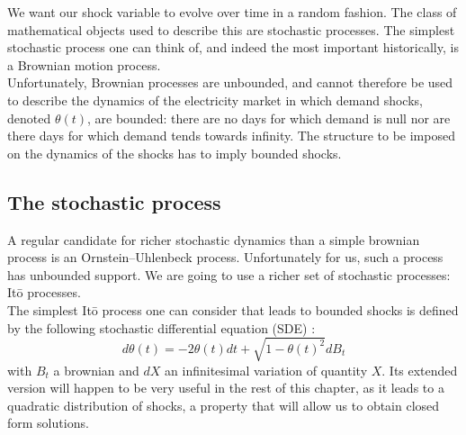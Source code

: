 We want our shock variable to evolve over time in a random fashion. The class of mathematical objects used to describe this are stochastic processes. The simplest stochastic process one can think of, and indeed the most important historically, is a Brownian motion process. \\

Unfortunately, Brownian processes are unbounded, and cannot therefore be used to describe the dynamics of the electricity market in which demand shocks, denoted $\theta(t)$, are bounded: there are no days for which demand is null nor are there days for which demand tends towards infinity. The structure to be imposed on the dynamics of the shocks has to imply bounded shocks.\\

%

\subsection{The stochastic process}
A regular candidate for richer stochastic dynamics than a simple brownian process is an Ornstein–Uhlenbeck process. Unfortunately for us, such a process has unbounded support. We are going to use a richer set of stochastic processes: It\={o} processes. \\

The simplest It\={o} process one can consider that leads to bounded shocks is defined by the following stochastic differential equation (SDE) \cite{enveloppe}:
\begin{equation}
d\theta(t)=-2\theta(t) dt+\sqrt{1-\theta(t)^2}dB_t
\label{eqSDE}
\end{equation}
with $B_t$ a brownian and $dX$ an infinitesimal variation of quantity $X$. Its extended version will happen to be very useful in the rest of this chapter, as it leads to a quadratic distribution of shocks, a property that will allow us to obtain closed form solutions.\\

